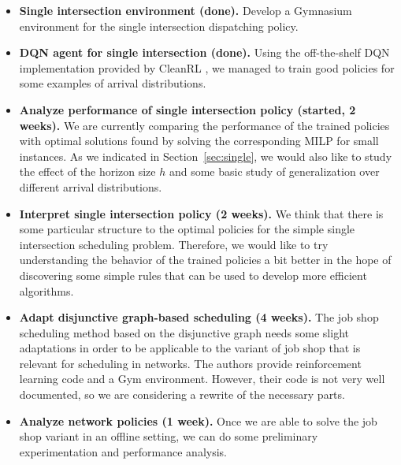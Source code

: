 \documentclass{article}
\begin{document}
\begin{itemize}

  \item \textbf{Single intersection environment (done).} Develop a Gymnasium
        \cite{towers_gymnasium_2023} environment for the single intersection
        dispatching policy.

  \item \textbf{DQN agent for single intersection (done).} Using the
        off-the-shelf DQN implementation provided by CleanRL
        \cite{huang2022cleanrl}, we managed to train good policies for some
        examples of arrival distributions.

  \item \textbf{Analyze performance of single intersection policy (started, 2
        weeks).} We are currently comparing the performance of the trained
        policies with optimal solutions found by solving the corresponding MILP
        for small instances. As we indicated in Section~\ref{sec:single}, we
        would also like to study the effect of the horizon size $h$ and some
        basic study of generalization over different arrival distributions.

  \item \textbf{Interpret single intersection policy (2 weeks).} We think that
        there is some particular structure to the optimal policies for the
        simple single intersection scheduling problem. Therefore, we would like
        to try understanding the behavior of the trained policies a bit better
        in the hope of discovering some simple rules that can be used to develop
        more efficient algorithms.

  \item \textbf{Adapt disjunctive graph-based scheduling (4 weeks).} The job
        shop scheduling method based on the disjunctive graph
        \cite{zhang_learning_2020} needs some slight adaptations in order to be
        applicable to the variant of job shop that is relevant for scheduling in
        networks. The authors provide reinforcement learning code and a Gym
        environment. However, their code is not very well documented, so we are
        considering a rewrite of the necessary parts.

  \item \textbf{Analyze network policies (1 week).} Once we are
        able to solve the job shop variant in an offline setting, we can do some
        preliminary experimentation and performance analysis.


\end{itemize}
\end{document}
